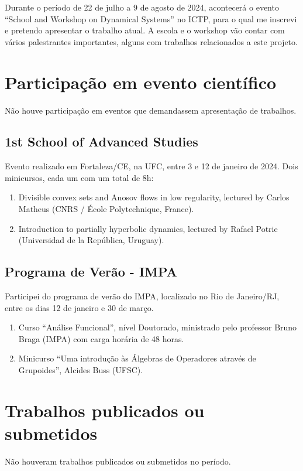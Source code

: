 \documentclass[a4paper,11pt,oneside]{memoir}
\begin{document}

Durante o período de 22 de julho a 9 de agosto de 2024, acontecerá o evento ``School and Workshop on Dynamical Systems'' no ICTP, para o qual me inscrevi e pretendo apresentar o trabalho atual. A escola e o workshop vão contar com vários palestrantes importantes, alguns com trabalhos relacionados a este projeto.

\chapter{Participação em evento científico}
Não houve participação em eventos que demandassem apresentação de trabalhos.

\section{1st School of Advanced Studies}
Evento realizado em Fortaleza/CE, na UFC, entre 3 e 12 de janeiro de 2024. Dois minicursos, cada um com um total de 8h:
\begin{enumerate}
  \item Divisible convex sets and Anosov flows in low regularity, lectured by Carlos Matheus (CNRS / École Polytechnique, France).
  \item Introduction to partially hyperbolic dynamics, lectured by Rafael Potrie (Universidad de la República, Uruguay).
\end{enumerate}

\section{Programa de Verão - IMPA}

Participei do programa de verão do IMPA, localizado no Rio de Janeiro/RJ, entre os dias 12 de janeiro e 30 de março.

\begin{enumerate}
  \item Curso ``Análise Funcional'', nível Doutorado, ministrado pelo professor Bruno Braga (IMPA) com carga horária de 48 horas.
  \item Minicurso ``Uma introdução às Álgebras de Operadores através de Grupoides'', Alcides Buss (UFSC).
\end{enumerate}
\chapter{Trabalhos publicados ou submetidos}
Não houveram trabalhos publicados ou submetidos no período.

\printbibliography
\end{document}
